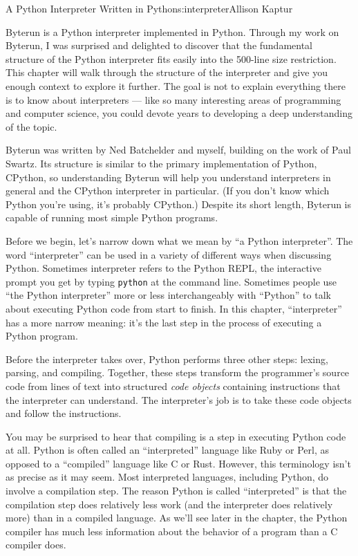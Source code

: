 \begin{aosachapter}{A Python Interpreter Written in Python}{s:interpreter}{Allison Kaptur}

\label{introduction}

Byterun is a Python interpreter implemented in Python. Through my work
on Byterun, I was surprised and delighted to discover that the
fundamental structure of the Python interpreter fits easily into the
500-line size restriction. This chapter will walk through the structure
of the interpreter and give you enough context to explore it further.
The goal is not to explain everything there is to know about
interpreters --- like so many interesting areas of programming and
computer science, you could devote years to developing a deep
understanding of the topic.

Byterun was written by Ned Batchelder and myself, building on the work
of Paul Swartz. Its structure is similar to the primary implementation
of Python, CPython, so understanding Byterun will help you understand
interpreters in general and the CPython interpreter in particular. (If
you don't know which Python you're using, it's probably CPython.)
Despite its short length, Byterun is capable of running most simple
Python programs.

\label{a-python-interpreter}

Before we begin, let's narrow down what we mean by ``a Python
interpreter''. The word ``interpreter'' can be used in a variety of
different ways when discussing Python. Sometimes interpreter refers to
the Python REPL, the interactive prompt you get by typing
\texttt{python} at the command line. Sometimes people use ``the Python
interpreter'' more or less interchangeably with ``Python'' to talk about
executing Python code from start to finish. In this chapter,
``interpreter'' has a more narrow meaning: it's the last step in the
process of executing a Python program.

Before the interpreter takes over, Python performs three other steps:
lexing, parsing, and compiling. Together, these steps transform the
programmer's source code from lines of text into structured \emph{code
objects} containing instructions that the interpreter can understand.
The interpreter's job is to take these code objects and follow the
instructions.

You may be surprised to hear that compiling is a step in executing
Python code at all. Python is often called an ``interpreted'' language
like Ruby or Perl, as opposed to a ``compiled'' language like C or Rust.
However, this terminology isn't as precise as it may seem. Most
interpreted languages, including Python, do involve a compilation step.
The reason Python is called ``interpreted'' is that the compilation step
does relatively less work (and the interpreter does relatively more)
than in a compiled language. As we'll see later in the chapter, the
Python compiler has much less information about the behavior of a
program than a C compiler does.


\end{aosachapter}
